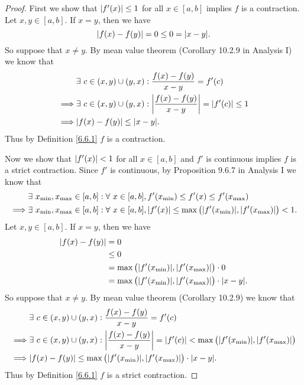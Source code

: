 \begin{proof}
    First we show that \(\abs*{f'(x)} \leq 1\) for all \(x \in [a, b]\) implies \(f\) is a contraction.
    Let \(x, y \in [a, b]\).
    If \(x = y\), then we have
    \[
        \abs*{f(x) - f(y)} = 0 \leq 0 = \abs*{x - y}.
    \]
    So suppose that \(x \neq y\).
    By mean value theorem (Corollary 10.2.9 in Analysis I) we know that
    \begin{align*}
                 & \exists\ c \in (x, y) \cup (y, x) : \frac{f(x) - f(y)}{x - y} = f'(c)                      \\
        \implies & \exists\ c \in (x, y) \cup (y, x) : \abs*{\frac{f(x) - f(y)}{x - y}} = \abs*{f'(c)} \leq 1 \\
        \implies & \abs*{f(x) - f(y)} \leq \abs{x - y}.
    \end{align*}
    Thus by Definition \ref{6.6.1} \(f\) is a contraction.

    Now we show that \(\abs*{f'(x)} < 1\) for all \(x \in [a, b]\) and \(f'\) is continuous implies \(f\) is a strict contraction.
    Since \(f'\) is continuous, by Proposition 9.6.7 in Analysis I we know that
    \begin{align*}
                 & \exists\ x_{\min}, x_{\max} \in [a, b] : \forall\ x \in [a, b], f'(x_{\min}) \leq f'(x) \leq f'(x_{\max})                                     \\
        \implies & \exists\ x_{\min}, x_{\max} \in [a, b] : \forall\ x \in [a, b], \abs*{f'(x)} \leq \max\big(\abs*{f'(x_{\min})}, \abs*{f'(x_{\max})}\big) < 1.
    \end{align*}
    Let \(x, y \in [a, b]\).
    If \(x = y\), then we have
    \begin{align*}
        \abs*{f(x) - f(y)} & = 0                                                                          \\
                           & \leq 0                                                                       \\
                           & = \max\big(\abs*{f'(x_{\min})}, \abs*{f'(x_{\max})}\big) \cdot 0             \\
                           & = \max\big(\abs*{f'(x_{\min})}, \abs*{f'(x_{\max})}\big) \cdot \abs*{x - y}.
    \end{align*}
    So suppose that \(x \neq y\).
    By mean value theorem (Corollary 10.2.9) we know that
    \begin{align*}
                 & \exists\ c \in (x, y) \cup (y, x) : \frac{f(x) - f(y)}{x - y} = f'(c)                                                                        \\
        \implies & \exists\ c \in (x, y) \cup (y, x) : \abs*{\frac{f(x) - f(y)}{x - y}} = \abs*{f'(c)} < \max\big(\abs*{f'(x_{\min})}, \abs*{f'(x_{\max})}\big) \\
        \implies & \abs*{f(x) - f(y)} \leq \max\big(\abs*{f'(x_{\min})}, \abs*{f'(x_{\max})}\big) \cdot \abs{x - y}.
    \end{align*}
    Thus by Definition \ref{6.6.1} \(f\) is a strict contraction.
\end{proof}

